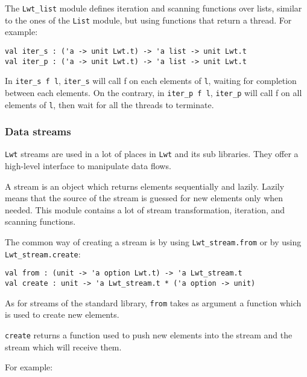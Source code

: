The {\tt Lwt\_list} module defines iteration and scanning functions
over lists, similar to the ones of the {\tt List} module, but using
functions that return a thread. For example:



\lstset{language=[Objective]Caml}\begin{lstlisting}
val iter_s : ('a -> unit Lwt.t) -> 'a list -> unit Lwt.t
val iter_p : ('a -> unit Lwt.t) -> 'a list -> unit Lwt.t

\end{lstlisting}
In {\tt iter\_s f l}, {\tt iter\_s} will call f on each elements
of {\tt l}, waiting for completion between each elements. On the
contrary, in {\tt iter\_p f l}, {\tt iter\_p} will call f on all
elements of {\tt l}, then wait for all the threads to terminate.



\subsubsection{ Data streams }

{\tt Lwt} streams are used in a lot of places in {\tt Lwt} and its sub
libraries. They offer a high-level interface to manipulate data flows.



A stream is an object which returns elements sequentially and
lazily. Lazily means that the source of the stream is guessed for new
elements only when needed. This module contains a lot of stream
transformation, iteration, and scanning functions.



The common way of creating a stream is by using
{\tt Lwt\_stream.from} or by using {\tt Lwt\_stream.create}:



\lstset{language=[Objective]Caml}\begin{lstlisting}
val from : (unit -> 'a option Lwt.t) -> 'a Lwt_stream.t
val create : unit -> 'a Lwt_stream.t * ('a option -> unit)

\end{lstlisting}
As for streams of the standard library, {\tt from} takes as
argument a function which is used to create new elements.



{\tt create} returns a function used to push new elements
into the stream and the stream which will receive them.



For example:



